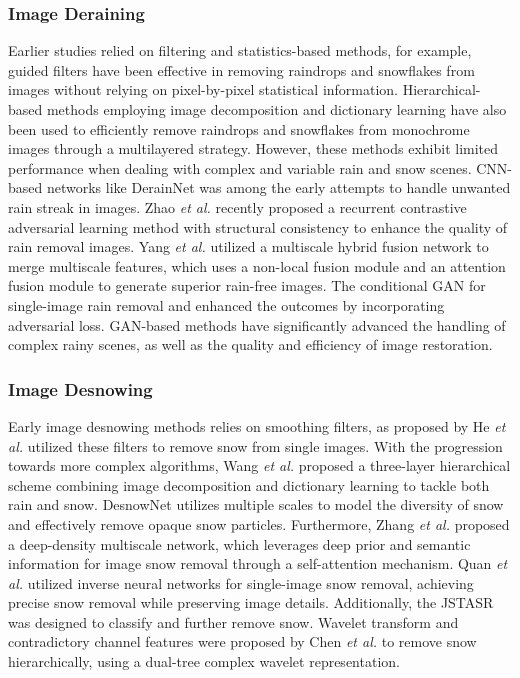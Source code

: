\documentclass[final,12pt]{elsarticle}
\begin{document}
\subsubsection{Image Deraining}
%
    Earlier studies relied on filtering and statistics-based methods, for example, guided filters \citep{xu2012removing} have been effective in removing raindrops and snowflakes from images without relying on pixel-by-pixel statistical information. Hierarchical-based methods employing image decomposition and dictionary learning \citep{wang2017hierarchical} have also been used to efficiently remove raindrops and snowflakes from monochrome images through a multilayered strategy. However, these methods exhibit limited performance when dealing with complex and variable rain and snow scenes. CNN-based networks like DerainNet\citep{fu2017clearing} was among the early attempts to handle unwanted rain streak in images. Zhao \textit{et al.} \citep{zhao2024cycle} recently proposed a recurrent contrastive adversarial learning method with structural consistency to enhance the quality of rain removal images. Yang \textit{et al.} \citep{yang2024single} utilized a multiscale hybrid fusion network to merge multiscale features, which uses a non-local fusion module and an attention fusion module to generate superior rain-free images. The conditional GAN \citep{yang2022rain} for single-image rain removal and enhanced the outcomes by incorporating adversarial loss. GAN-based methods have significantly advanced the handling of complex rainy scenes, as well as the quality and efficiency of image restoration.
%
\subsubsection{Image Desnowing}
%
    Early image desnowing methods relies on smoothing filters, as proposed by He \textit{et al.} \citep{xu2012removing} utilized these filters to remove snow from single images. With the progression towards more complex algorithms, Wang \textit{et al.} \citep{wang2017hierarchical} proposed a three-layer hierarchical scheme combining image decomposition and dictionary learning to tackle both rain and snow. DesnowNet \citep{liu2018desnownet} utilizes multiple scales to model the diversity of snow and effectively remove opaque snow particles. Furthermore, Zhang \textit{et al.} \citep{zhang2021deep} proposed a deep-density multiscale network, which leverages deep prior and semantic information for image snow removal through a self-attention mechanism. Quan \textit{et al.} \citep{quan2023image} utilized inverse neural networks for single-image snow removal, achieving precise snow removal while preserving image details. Additionally, the JSTASR \citep{chen2020jstasr} was designed to classify and further remove snow. Wavelet transform and contradictory channel features were proposed by Chen \textit{et al.} \citep{chen2021all} to remove snow hierarchically, using a dual-tree complex wavelet representation.
%
\end{document}
